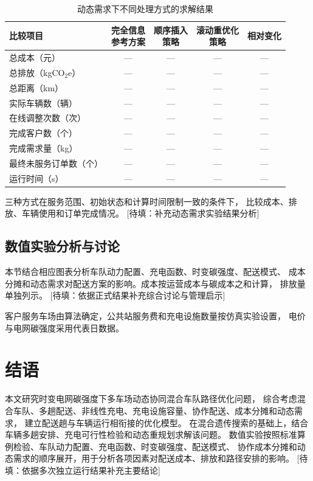 \documentclass{setp-new}
\newcommand{\setptabsetup}{\small\renewcommand{\arraystretch}{0.95}\setlength{\tabcolsep}{2.2pt}\hbadness=10000}
\DeclareRobustCommand{\TBD}[1]{%
  \textcolor{black!65}{[待填：#1]}}
\begin{document}
\begin{table}[H]
  \centering
  \caption{动态需求下不同处理方式的求解结果}
  \label{tab:dynamic}
  \setptabsetup
  \begin{tabular*}{\linewidth}{@{\extracolsep{\fill}}lcccc@{}}
    \toprule
    比较项目 & \makecell{完全信息\\参考方案} & \makecell{顺序插入\\策略} & \makecell{滚动重优化\\策略} & 相对变化\\
    \midrule
    总成本（元） & --- & --- & --- & ---\\
    总排放（kgCO$_2$e） & --- & --- & --- & ---\\
    总距离（km） & --- & --- & --- & ---\\
    实际车辆数（辆） & --- & --- & --- & ---\\
    在线调整次数（次） & --- & --- & --- & ---\\
    完成客户数（个） & --- & --- & --- & ---\\
    完成需求量（kg） & --- & --- & --- & ---\\
    最终未服务订单数（个） & --- & --- & --- & ---\\
    运行时间（s） & --- & --- & --- & ---\\
    \bottomrule
  \end{tabular*}
\end{table}

三种方式在服务范围、初始状态和计算时间限制一致的条件下，
比较成本、排放、车辆使用和订单完成情况。\TBD{补充动态需求实验结果分析}

\subsection{数值实验分析与讨论}

本节结合相应图表分析车队动力配置、充电函数、时变碳强度、配送模式、
成本分摊和动态需求对配送方案的影响。成本按运营成本与碳成本之和计算，
排放量单独列示。\TBD{依据正式结果补充综合讨论与管理启示}

客户服务车场由算法确定，公共站服务费和充电设施数量按仿真实验设置，
电价与电网碳强度采用代表日数据。

\section{结语}

本文研究时变电网碳强度下多车场动态协同混合车队路径优化问题，
综合考虑混合车队、多趟配送、非线性充电、充电设施容量、协作配送、成本分摊和动态需求，
建立配送趟与车辆运行相衔接的优化模型。
在混合遗传搜索的基础上，结合车辆多趟安排、充电可行性检验和动态重规划求解该问题。
数值实验按照标准算例检验、车队动力配置、充电函数、时变碳强度、配送模式、
协作成本分摊和动态需求的顺序展开，用于分析各项因素对配送成本、排放和路径安排的影响。
\TBD{依据多次独立运行结果补充主要结论}
\end{document}
